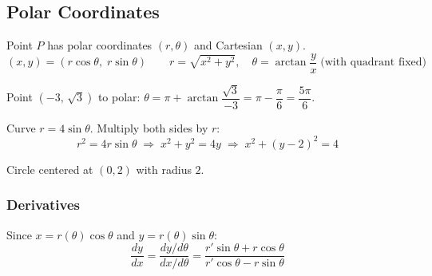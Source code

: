 \subsection{Polar Coordinates}

Point $P$ has polar coordinates $(r,\theta)$ and Cartesian $(x,y)$.
\[
  (x,y) = (r\cos\theta,\; r\sin\theta)
  \qquad
  r = \sqrt{x^{2}+y^{2}}, \quad
  \theta = \arctan\frac{y}{x} \;\text{(with quadrant fixed)}
\]

\begin{example}
  Point $(-3,\,\sqrt{3})$ to polar: \quad
  $\theta = \pi + \arctan\dfrac{\sqrt{3}}{-3} = \pi - \dfrac{\pi}{6} = \dfrac{5\pi}{6}$.
\end{example}

\begin{example}
  Curve $r = 4\sin\theta$. Multiply both sides by $r$:
  \[
    r^{2} = 4r\sin\theta
    \;\Longrightarrow\;
    x^{2}+y^{2} = 4y
    \;\Longrightarrow\;
    x^{2}+(y-2)^{2} = 4
  \]

  \begin{center}
  \end{center}
  Circle centered at $(0,2)$ with radius $2$.
\end{example}

\subsubsection{Derivatives}

Since $x = r(\theta)\cos\theta$ and $y = r(\theta)\sin\theta$:
\[
  \frac{dy}{dx}
  = \frac{dy/d\theta}{dx/d\theta}
  = \frac{r'\sin\theta + r\cos\theta}{r'\cos\theta - r\sin\theta}
\]

